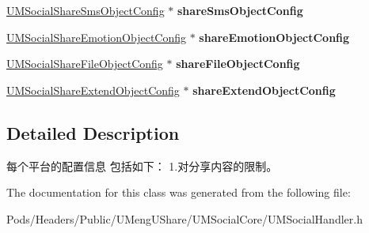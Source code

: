 \begin{DoxyCompactItemize}
\mbox{\hyperlink{interface_u_m_social_share_sms_object_config}{U\+M\+Social\+Share\+Sms\+Object\+Config}} $\ast$ {\bfseries share\+Sms\+Object\+Config}
\item 
\mbox{\label{interface_u_m_social_handler_config_a070216b4e891465c849db7506c194516}} 
\mbox{\hyperlink{interface_u_m_social_share_emotion_object_config}{U\+M\+Social\+Share\+Emotion\+Object\+Config}} $\ast$ {\bfseries share\+Emotion\+Object\+Config}
\item 
\mbox{\label{interface_u_m_social_handler_config_a33f0eacb33ae1fbea5ce696a0c22c604}} 
\mbox{\hyperlink{interface_u_m_social_share_file_object_config}{U\+M\+Social\+Share\+File\+Object\+Config}} $\ast$ {\bfseries share\+File\+Object\+Config}
\item 
\mbox{\label{interface_u_m_social_handler_config_ae429aad702788e2cb2ff348469d8082e}} 
\mbox{\hyperlink{interface_u_m_social_share_extend_object_config}{U\+M\+Social\+Share\+Extend\+Object\+Config}} $\ast$ {\bfseries share\+Extend\+Object\+Config}
\end{DoxyCompactItemize}


\subsection{Detailed Description}
每个平台的配置信息 包括如下： 1.对分享内容的限制。 

The documentation for this class was generated from the following file\+:\begin{DoxyCompactItemize}
\item 
Pods/\+Headers/\+Public/\+U\+Meng\+U\+Share/\+U\+M\+Social\+Core/U\+M\+Social\+Handler.\+h\end{DoxyCompactItemize}
